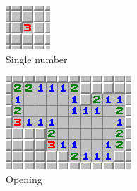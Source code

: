 \begin{figure}[h]
    \centering
    \begin{subfigure}[t]{0.2\textwidth}
        \centering
        \includegraphics[width=0.8\linewidth]{figures/2.1/single}
        \caption{Single number}
    \end{subfigure}
    \begin{subfigure}[t]{0.2\textwidth}
        \centering
        \includegraphics[width=0.8\linewidth]{figures/2.1/opening}
        \caption{Opening}
    \end{subfigure}
    \begin{subfigure}[t]{0.2\textwidth}
        \centering

\end{subfigure}
\end{figure}
